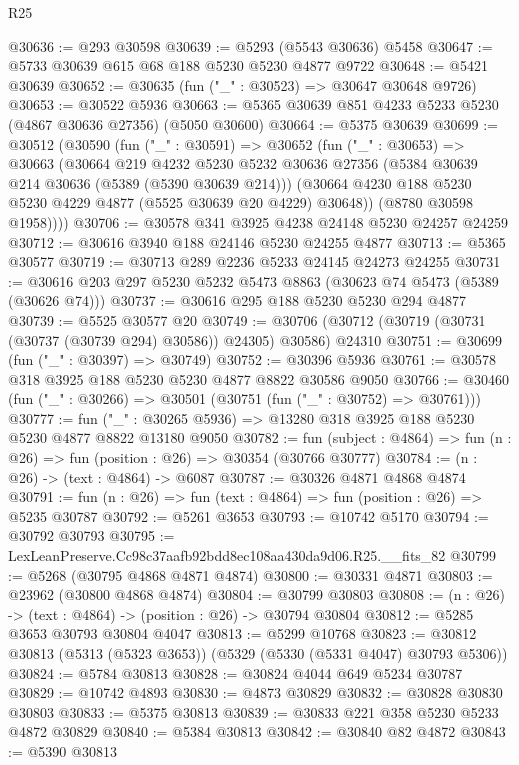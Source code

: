 \begin{lexlean}{R25}
\begin{coremodule}
@30636 := @293 @30598
@30639 := @5293 (@5543 @30636) @5458
@30647 := @5733 @30639 @615 @68 @188 @5230 @5230 @4877 @9722
@30648 := @5421 @30639
@30652 := @30635 (fun ("_" : @30523) => @30647 @30648 @9726)
@30653 := @30522 @5936
@30663 := @5365 @30639 @851 @4233 @5233 @5230 (@4867 @30636 @27356) (@5050 @30600)
@30664 := @5375 @30639
@30699 := @30512
    (@30590
      (fun ("_" : @30591) =>
      @30652
        (fun ("_" : @30653) =>
        @30663
          (@30664
            @219
            @4232
            @5230
            @5232
            @30636
            @27356
            (@5384 @30639 @214 @30636 (@5389 (@5390 @30639 @214)))
            (@30664 @4230 @188 @5230 @5230 @4229 @4877 (@5525 @30639 @20 @4229) @30648))
          (@8780 @30598 @1958))))
@30706 := @30578 @341 @3925 @4238 @24148 @5230 @24257 @24259
@30712 := @30616 @3940 @188 @24146 @5230 @24255 @4877
@30713 := @5365 @30577
@30719 := @30713 @289 @2236 @5233 @24145 @24273 @24255
@30731 := @30616 @203 @297 @5230 @5232 @5473 @8863 (@30623 @74 @5473 (@5389 (@30626 @74)))
@30737 := @30616 @295 @188 @5230 @5230 @294 @4877
@30739 := @5525 @30577 @20
@30749 := @30706 (@30712 (@30719 (@30731 (@30737 (@30739 @294) @30586)) @24305) @30586) @24310
@30751 := @30699 (fun ("_" : @30397) => @30749)
@30752 := @30396 @5936
@30761 := @30578 @318 @3925 @188 @5230 @5230 @4877 @8822 @30586 @9050
@30766 := @30460 (fun ("_" : @30266) => @30501 (@30751 (fun ("_" : @30752) => @30761)))
@30777 := fun ("_" : @30265 @5936) => @13280 @318 @3925 @188 @5230 @5230 @4877 @8822 @13180 @9050
@30782 := fun (subject : @4864) => fun (n : @26) => fun (position : @26) => @30354 (@30766 @30777)
@30784 := (n : @26) -> (text : @4864) -> @6087
@30787 := @30326 @4871 @4868 @4874
@30791 := fun (n : @26) => fun (text : @4864) => fun (position : @26) => @5235 @30787
@30792 := @5261 @3653
@30793 := @10742 @5170
@30794 := @30792 @30793
@30795 := LexLeanPreserve.Cc98c37aafb92bdd8ec108aa430da9d06.R25.__fits_82
@30799 := @5268 (@30795 @4868 @4871 @4874)
@30800 := @30331 @4871
@30803 := @23962 (@30800 @4868 @4874)
@30804 := @30799 @30803
@30808 := (n : @26) -> (text : @4864) -> (position : @26) -> @30794 @30804
@30812 := @5285 @3653 @30793 @30804 @4047
@30813 := @5299 @10768
@30823 := @30812 @30813 (@5313 (@5323 @3653)) (@5329 (@5330 (@5331 @4047) @30793 @5306))
@30824 := @5784 @30813
@30828 := @30824 @4044 @649 @5234 @30787
@30829 := @10742 @4893
@30830 := @4873 @30829
@30832 := @30828 @30830 @30803
@30833 := @5375 @30813
@30839 := @30833 @221 @358 @5230 @5233 @4872 @30829
@30840 := @5384 @30813
@30842 := @30840 @82 @4872
@30843 := @5390 @30813

\end{coremodule}
\end{lexlean}
